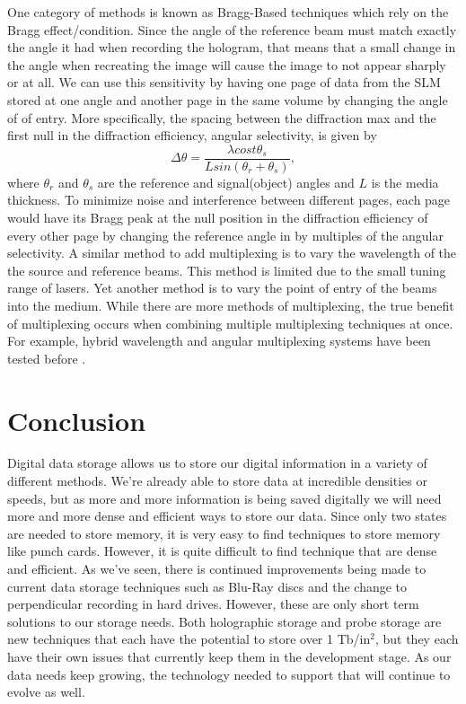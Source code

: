\documentclass[ notitlepage, numerical, 11pt]{revtex4-1} %
\begin{document}
One category of methods is known as Bragg-Based techniques which rely on the Bragg effect/condition. Since the angle of the reference beam must match exactly the angle it had when recording the hologram, that means that a small change in the angle when recreating the image will cause the image to not appear sharply or at all. We can use this sensitivity by having one page of data from the SLM stored at one angle and another page in the same volume by changing the angle of of entry. More specifically, the spacing between the diffraction max and the first null in the diffraction efficiency, angular selectivity, is given by
\begin{equation}
\Delta \theta = \frac{\lambda cost\theta_s}{Lsin(\theta_r + \theta_s)},
\label{angular}
\end{equation}
where $\theta_r$ and $\theta_s$ are the reference and signal(object) angles and $L$ is the media thickness. To minimize noise and interference between different pages, each page would have its Bragg peak at the null position in the diffraction efficiency of every other page by changing the reference angle in by multiples of the angular selectivity. A similar method to add multiplexing is to vary the wavelength of the the source and reference beams. This method is limited due to the small tuning range of lasers. Yet another method is to vary the point of entry of the beams into the medium. While there are more methods of multiplexing, the true benefit of multiplexing occurs when combining multiple multiplexing techniques at once. For example, hybrid wavelength and angular multiplexing systems have been tested before \cite{memory}. 

\section{Conclusion}
Digital data storage allows us to store our digital information in a variety of different methods. We're already able to store data at incredible densities or speeds, but as more and more information is being saved digitally we will need more and more dense and efficient ways to store our data. Since only two states are needed to store memory, it is very easy to find techniques to store memory like punch cards. However, it is quite difficult to find technique that are dense and efficient. As we've seen, there is continued improvements being made to current data storage techniques such as Blu-Ray discs and the change to perpendicular recording in hard drives. However, these are only short term solutions to our storage needs. Both holographic storage and probe storage are new techniques that each have the potential to store over 1 Tb/in$^2$, but they each have their own issues that currently keep them in the development stage. As our data needs keep growing, the technology needed to support that will continue to evolve as well.





\end{document}
